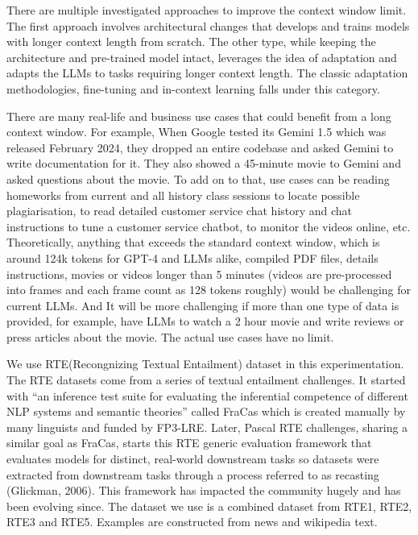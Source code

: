 \documentclass[10pt,twocolumn,letterpaper]{article}
\begin{document}
There are multiple investigated approaches to improve the context window limit. The first approach involves architectural changes that develops and trains models with longer context length from scratch. The other type, while keeping the architecture and pre-trained model intact, leverages the idea of adaptation and adapts the LLMs to tasks requiring longer context length. The classic adaptation methodologies, fine-tuning and in-context learning falls under this category.

There are many real-life and business use cases that could benefit from a long context window.
For example, When Google tested its Gemini 1.5 which was released February 2024, they dropped an entire codebase and asked Gemini to write documentation for it. They also showed a 45-minute movie to Gemini and asked questions about the movie. To add on to that, use cases can be reading homeworks from current and all history class sessions to locate possible plagiarisation, to read detailed customer service chat history and chat instructions to tune a customer service chatbot, to monitor the videos online, etc. Theoretically, anything that exceeds the standard context window, which is around 124k tokens for GPT-4 and LLMs alike, compiled PDF files, details instructions, movies or videos longer than 5 minutes (videos are pre-processed into frames and each frame count as 128 tokens roughly) would be challenging for current LLMs. And It will be more challenging if more than one type of data is provided, for example, have LLMs to watch a 2 hour movie and write reviews or press articles about the movie. The actual use cases have no limit.

We use RTE(Recongnizing Textual Entailment) dataset in this experimentation. The RTE datasets come from a series of textual entailment challenges. It started with “an inference test suite for evaluating the inferential competence of different NLP systems and semantic theories” called FraCas which is created manually by many linguists and funded by FP3-LRE. Later, Pascal RTE challenges, sharing a similar goal as FraCas, starts this RTE generic evaluation framework that evaluates models for distinct, real-world downstream tasks so datasets were extracted from downstream tasks through a process referred to as recasting (Glickman, 2006). This framework has impacted the community hugely and has been evolving since. The dataset we use is a combined dataset from RTE1, RTE2, RTE3 and RTE5. Examples are constructed from news and wikipedia text.
\end{document}
